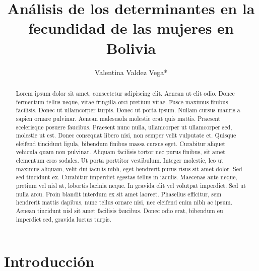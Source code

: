 \documentclass[Royal,times,sageh]{sagej}
\begin{document}

\title{Análisis de los determinantes en la fecundidad de las mujeres en
Bolivia}


\author{Valentina Valdez Vega*}




\begin{abstract}
Lorem ipsum dolor sit amet, consectetur adipiscing elit. Aenean ut elit
odio. Donec fermentum tellus neque, vitae fringilla orci pretium vitae.
Fusce maximus finibus facilisis. Donec ut ullamcorper turpis. Donec ut
porta ipsum. Nullam cursus mauris a sapien ornare pulvinar. Aenean
malesuada molestie erat quis mattis. Praesent scelerisque posuere
faucibus. Praesent nunc nulla, ullamcorper ut ullamcorper sed, molestie
ut est. Donec consequat libero nisi, non semper velit vulputate et.
Quisque eleifend tincidunt ligula, bibendum finibus massa cursus eget.
Curabitur aliquet vehicula quam non pulvinar. Aliquam facilisis tortor
nec purus finibus, sit amet elementum eros sodales. Ut porta porttitor
vestibulum. Integer molestie, leo ut maximus aliquam, velit dui iaculis
nibh, eget hendrerit purus risus sit amet dolor. Sed sed tincidunt ex.
Curabitur imperdiet egestas tellus in iaculis. Maecenas ante neque,
pretium vel nisl at, lobortis lacinia neque. In gravida elit vel
volutpat imperdiet. Sed ut nulla arcu. Proin blandit interdum ex sit
amet laoreet. Phasellus efficitur, sem hendrerit mattis dapibus, nunc
tellus ornare nisi, nec eleifend enim nibh ac ipsum. Aenean tincidunt
nisl sit amet facilisis faucibus. Donec odio erat, bibendum eu imperdiet
sed, gravida luctus turpis.
\end{abstract}


\maketitle

\section{Introducción}\label{introducciuxf3n}
\end{document}
